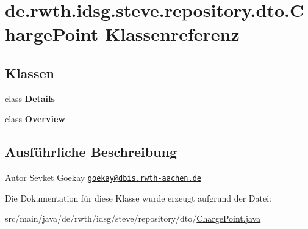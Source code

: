 \hypertarget{classde_1_1rwth_1_1idsg_1_1steve_1_1repository_1_1dto_1_1_charge_point}{\section{de.\+rwth.\+idsg.\+steve.\+repository.\+dto.\+Charge\+Point Klassenreferenz}
\label{classde_1_1rwth_1_1idsg_1_1steve_1_1repository_1_1dto_1_1_charge_point}
}
\subsection*{Klassen}
\begin{DoxyCompactItemize}
\item 
class {\bfseries Details}
\item 
class {\bfseries Overview}
\end{DoxyCompactItemize}


\subsection{Ausführliche Beschreibung}
\begin{DoxyAuthor}{Autor}
Sevket Goekay \href{mailto:goekay@dbis.rwth-aachen.de}{\tt goekay@dbis.\+rwth-\/aachen.\+de} 
\end{DoxyAuthor}


Die Dokumentation für diese Klasse wurde erzeugt aufgrund der Datei\+:\begin{DoxyCompactItemize}
\item 
src/main/java/de/rwth/idsg/steve/repository/dto/\hyperlink{_charge_point_8java}{Charge\+Point.\+java}\end{DoxyCompactItemize}

